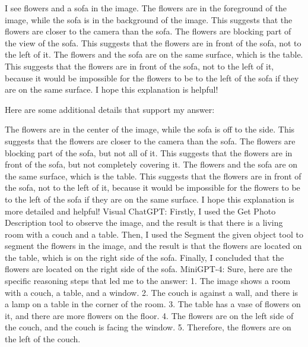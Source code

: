 \begin{enumerate}
    I see flowers and a sofa in the image.
    The flowers are in the foreground of the image, while the sofa is in the background of the image. This suggests that the flowers are closer to the camera than the sofa.
    The flowers are blocking part of the view of the sofa. This suggests that the flowers are in front of the sofa, not to the left of it.
    The flowers and the sofa are on the same surface, which is the table. This suggests that the flowers are in front of the sofa, not to the left of it, because it would be impossible for the flowers to be to the left of the sofa if they are on the same surface.
    I hope this explanation is helpful!
    
    Here are some additional details that support my answer:
    
    The flowers are in the center of the image, while the sofa is off to the side. This suggests that the flowers are closer to the camera than the sofa.
    The flowers are blocking part of the sofa, but not all of it. This suggests that the flowers are in front of the sofa, but not completely covering it.
    The flowers and the sofa are on the same surface, which is the table. This suggests that the flowers are in front of the sofa, not to the left of it, because it would be impossible for the flowers to be to the left of the sofa if they are on the same surface.
    I hope this explanation is more detailed and helpful!
    \subitem Visual ChatGPT: Firstly, I used the Get Photo Description tool to observe the image, and the result is that there is a living room with a couch and a table. Then, I used the Segment the given object tool to segment the flowers in the image, and the result is that the flowers are located on the table, which is on the right side of the sofa. Finally, I concluded that the flowers are located on the right side of the sofa.
    \subitem MiniGPT-4: Sure, here are the specific reasoning steps that led me to the answer:
    1. The image shows a room with a couch, a table, and a window.
    2. The couch is against a wall, and there is a lamp on a table in the corner of the room.
    3. The table has a vase of flowers on it, and there are more flowers on the floor.
    4. The flowers are on the left side of the couch, and the couch is facing the window.
    5. Therefore, the flowers are on the left of the couch.
\end{enumerate}
